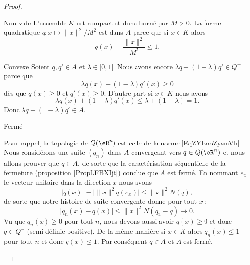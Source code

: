 \begin{proof}
\begin{subproof}
            \begin{subproof}
            \item[Non vide]
                L'ensemble \( K\) est compact et donc borné par \( M>0\). La forme quadratique \( q\colon x\mapsto \| x \|^2/M^2\) est dans \( A\) parce que si \( x\in K\) alors 
                \begin{equation}
                    q(x)=\frac{ \| x \|^2 }{ M^2 }\leq 1.
                \end{equation}
            \item[Convexe]
                Soient \( q,q'\in A\) et \( \lambda\in\mathopen[ 0 , 1 \mathclose]\). Nous avons encore \( \lambda q+(1-\lambda)q'\in Q^+\) parce que 
                \begin{equation}
                    \lambda q(x)+(1-\lambda)q'(x)\geq 0
                \end{equation}
                dès que \( q(x)\geq 0\) et \( q'(x)\geq 0\).
            D'autre part si \( x\in K\) nous avons
            \begin{equation}
                \lambda q(x)+(1-\lambda)q'(x)\leq \lambda+(1-\lambda)=1.
            \end{equation}
            Donc \( \lambda q+(1-\lambda)q'\in A\).

        \item[Fermé]

            Pour rappel, la topologie de \( Q(\eR^n)\) est celle de la norme \eqref{EqZYBooZysmVh}. Nous considérons une suite \( (q_n)\) dans \( A\) convergeant vers \( q\in Q(\eR^n)\) et nous allons prouver que \( q\in A\), de sorte que la caractérisation séquentielle de la fermeture (proposition \ref{PropLFBXIjt}) conclue que \( A\) est fermé. En nommant \( e_x\) le vecteur unitaire dans la direction \( x\) nous avons
            \begin{equation}
                \big| q(x) \big|=\big| \| x \|^2q(e_x) \big|\leq \| x \|^2N(q),
            \end{equation}
            de sorte que notre histoire de suite convergente  donne pour tout \( x\) :
            \begin{equation}
                \big| q_n(x)-q(x) \big|\leq \| x \|^2N(q_n-q)\to 0.
            \end{equation}
            Vu que \( q_n(x)\geq 0\) pour tout \( n\), nous devons aussi avoir \( q(x)\geq 0\) et donc \( q\in Q^+\) (semi-définie positive). De la même manière si \( x\in K\) alors \( q_n(x)\leq 1\) pour tout \( n\) et donc \( q(x)\leq 1\). Par conséquent \( q\in A\) et \( A\) est fermé.


\end{subproof}
\end{subproof}
\end{proof}
